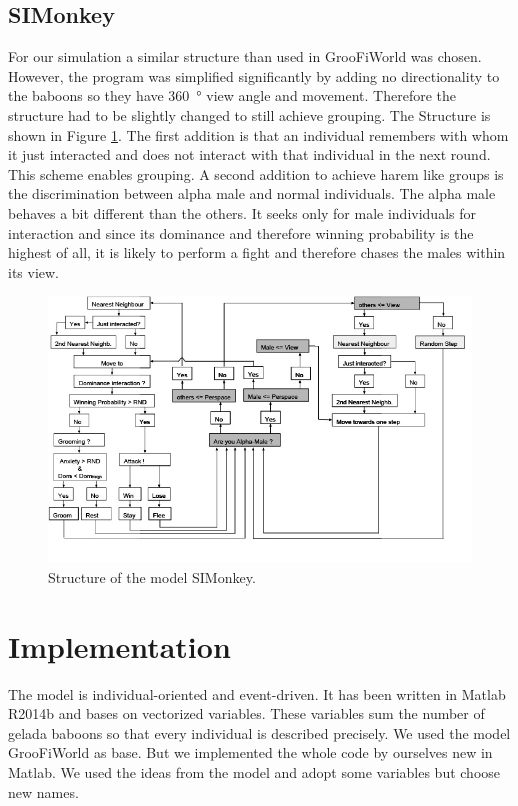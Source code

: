 \documentclass[11pt]{article}
\begin{document}
\subsection{SIMonkey}
\label{sec:SIMonkey}
For our simulation a similar structure than used in GrooFiWorld was chosen. However, the program was simplified significantly by adding no directionality to the baboons so they have \SI{360}{\degree} view angle and movement. Therefore the structure had to be slightly changed to still achieve grouping. The Structure is shown in Figure \ref{fig:SIMonkey_Flussdiagramm}. The first addition is that an individual remembers with whom it just interacted and does not interact with that individual in the next round. This scheme enables grouping. A second addition to achieve harem like groups is the discrimination between alpha male and normal individuals. The alpha male behaves a bit different than the others. It seeks only for male individuals for interaction and since its dominance and therefore winning probability is the highest of all, it is likely to perform a fight and therefore chases the males within its view.

\begin{figure}[H]
\centering
\includegraphics[scale=0.65]{Photos/Flussdiagramm}
\caption[Structure of the model SIMonkey]{Structure of the model SIMonkey.}
\label{fig:SIMonkey_Flussdiagramm}
\end{figure}

\section{Implementation}
The model is individual-oriented and event-driven. It has been written in Matlab R2014b and bases on vectorized variables. These variables sum the number of gelada baboons so that every individual is described precisely.
We used the model GrooFiWorld as base. But we implemented the whole code by ourselves new in Matlab. We used the ideas from the model and adopt some variables but choose new names.
\end{document}
